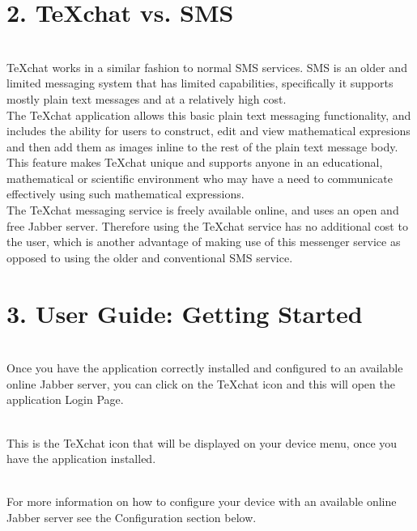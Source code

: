 \documentclass[29pt,a4paper]{moderncv}
\begin{document}
\newpage
\section*{\textbf{2. TeXchat vs. SMS}}
	\vspace{4mm}
		 \\TeXchat works in a similar fashion to normal SMS services. SMS is an older and limited messaging system that has limited capabilities, specifically it supports mostly plain text messages and at a relatively high cost. \\ 
		 
		 The TeXchat application allows this basic plain text messaging functionality, and includes the ability for users to construct, edit and view mathematical expresions and then add them as images inline to the rest of the plain text message body.  This feature makes TeXchat unique and supports anyone in an educational, mathematical or scientific environment who may have a need to communicate effectively using such mathematical expressions. \\  
		 
		 The TeXchat messaging service is freely available online, and uses an open and free Jabber server.  Therefore using the TeXchat service has no additional cost to the user, which is another advantage of making use of this messenger service as opposed to using the older and conventional SMS service.   \\
	\vspace{5mm}
		
\newpage
	\section*{3. User Guide: Getting Started}
	\vspace{4mm}
	\\Once you have the application correctly installed and configured to an available online Jabber server, you can click on the TeXchat icon and this will open the application Login Page.  
	
	\\This is the TeXchat icon that will be displayed on your device menu, once you have the application installed.
	
	\\For more information on how to configure your device with an available online Jabber server see the Configuration section below.
	
	\vspace{5mm}
\end{document}
